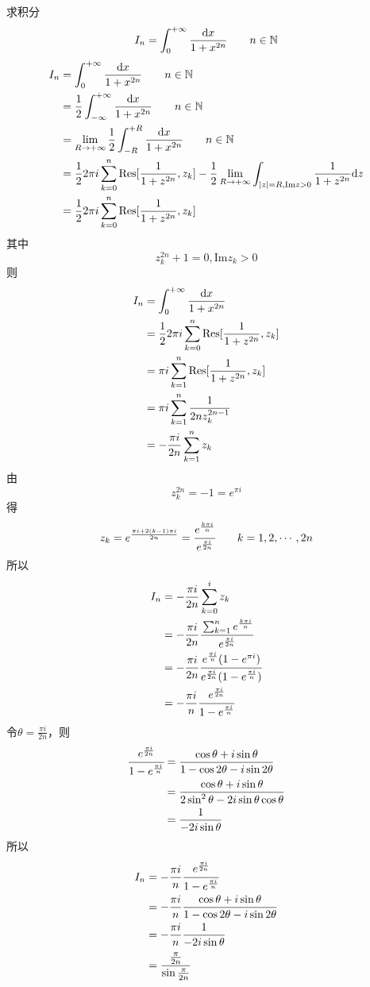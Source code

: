 \begin{homeworkProblem}
    求积分
    \[
    I_{n} = \int_0^{+\infty}\frac{\mathrm{d}x}{1+x^{2n}}\qquad n\in\mathbb{N}
    \]
\solution
\[\begin{split}
I_{n} &= \int_0^{+\infty}\frac{\mathrm{d}x}{1+x^{2n}}\qquad n\in\mathbb{N}\\
&= \frac{1}{2}\int_{-\infty}^{+\infty}\frac{\mathrm{d}x}{1+x^{2n}}\qquad n\in\mathbb{N}\\
&= \lim_{R\rightarrow+\infty}\frac{1}{2}\int_{-R}^{+R}\frac{\mathrm{d}x}{1+x^{2n}}\qquad n\in\mathbb{N}\\
&= \frac{1}{2}2\pi i\sum_{k=0}^{n}\mathrm{Res}[\frac{1}{1+z^{2n}}, z_k] - \frac{1}{2}\lim_{R\rightarrow+\infty}\int_{|z|=R, \mathrm{Im}z>0}\frac{1}{1+z^{2n}}\mathrm{d}z\\
&=\frac{1}{2}2\pi i\sum_{k=0}^{n}\mathrm{Res}[\frac{1}{1+z^{2n}}, z_k]
\end{split}\]
其中
\[z_k^{2n}+1=0, \mathrm{Im}z_k>0\]
则
\[\begin{split}
I_n &= \int_0^{+\infty}\frac{\mathrm{d}x}{1+x^{2n}}\\
&= \frac{1}{2}2\pi i\sum_{k=0}^{n}\mathrm{Res}[\frac{1}{1+z^{2n}}, z_k] \\
&= \pi i\sum_{k=1}^{n}\mathrm{Res}[\frac{1}{1+z^{2n}}, z_k]\\
&= \pi i\sum_{k=1}^{n}\frac{1}{2nz_k^{2n-1}}\\
&= -\frac{\pi i}{2n}\sum_{k=1}^{n}z_k
\end{split}\]
由\[z_k^{2n}=-1=e^{\pi i}\]得\[z_k=e^\frac{\pi i+2(k-1)\pi i}{2n}=\cfrac {e^{\frac{k\pi i}{n}}} {e^{\frac{\pi i}{2n}}} \qquad k=1,2,\cdots,2n\]
所以
\[\begin{split}
I_n &= -\frac{\pi i}{2n}\sum_{k=0}^{i}z_k \\
&= -\frac{\pi i}{2n}\cfrac{\sum_{k=1}^{n}e^{\frac{k\pi i}{n}}}{e^{\frac{\pi i}{2n}}}\\
&= -\frac{\pi i}{2n}\cfrac{e^{\frac{\pi i}{n}}(1-e^{\pi i})}{e^{\frac{\pi i}{2n}}(1-e^{\frac{\pi i}{n}})}\\
&=-\frac{\pi i}{n}\cfrac{e^{\frac{\pi i}{2n}}}{1-e^{\frac{\pi i}{n}}}
\end{split}\]
令$\theta=\frac{\pi i}{2n}$，则
\[\begin{split}
\cfrac{e^{\frac{\pi i}{2n}}}{1-e^{\frac{\pi i}{n}}}
&= \frac{\cos\theta + i\sin\theta}{1-\cos2\theta-i\sin2\theta}\\
&= \frac{\cos\theta + i\sin\theta}{2\sin^2\theta-2i\sin\theta\cos\theta}\\
&= \frac{1}{-2i\sin\theta}
\end{split}\]
所以
\[\begin{split}
I_n &= -\frac{\pi i}{n}\cfrac{e^{\frac{\pi i}{2n}}}{1-e^{\frac{\pi i}{n}}}\\
&= -\frac{\pi i}{n}\frac{\cos\theta + i\sin\theta}{1-\cos2\theta-i\sin2\theta}\\
&=-\frac{\pi i}{n}\frac{1}{-2i\sin\theta}\\
&= \cfrac{\frac{\pi}{2n}}{\sin\frac{\pi}{2n}}
\end{split}\]
\end{homeworkProblem}
